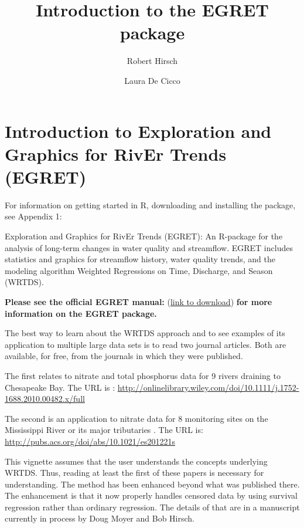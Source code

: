 \documentclass[a4paper,11pt]{article}\usepackage{graphicx, color}
\begin{document}
\title{Introduction to the EGRET package}
\author[1]{Robert Hirsch}
\author[1]{Laura De Cicco}

\maketitle
\tableofcontents

\section{Introduction to Exploration and Graphics for RivEr Trends (EGRET)}

For information on getting started in R, downloading and installing the package, see Appendix 1: 

Exploration and Graphics for RivEr Trends (EGRET): An R-package for the analysis of long-term changes in water quality and streamflow. EGRET includes statistics and graphics for streamflow history, water quality trends, and the modeling algorithm Weighted Regressions on Time, Discharge, and Season (WRTDS). 


\textbf{Please see the official EGRET manual:}
(\href{https://github.com/USGS-R/EGRET/raw/Documentation/EGRET%2Bmanual_4.doc}{link to download}) 
\textbf{for more information on the EGRET package.}


The best way to learn about the WRTDS approach and to see examples of its application to multiple large data sets is to read two journal articles.  Both are available, for free, from the journals in which they were published.

The first relates to nitrate and total phosphorus data for 9 rivers draining to Chesapeake Bay.  The URL is \cite{HirschII}: 
\url{http://onlinelibrary.wiley.com/doi/10.1111/j.1752-1688.2010.00482.x/full}

The second is an application to nitrate data for 8 monitoring sites on the Mississippi River or its major tributaries \cite{HirschIII}.  The URL is: \url{http://pubs.acs.org/doi/abs/10.1021/es201221s}

This vignette assumes that the user understands the concepts underlying WRTDS.  Thus, reading at least the first of these papers is necessary for understanding.  The method has been enhanced beyond what was published there.  The enhancement is that it now properly handles censored data by using survival regression rather than ordinary regression.  The details of that are in a manuscript currently in process by Doug Moyer and Bob Hirsch.
\end{document}
